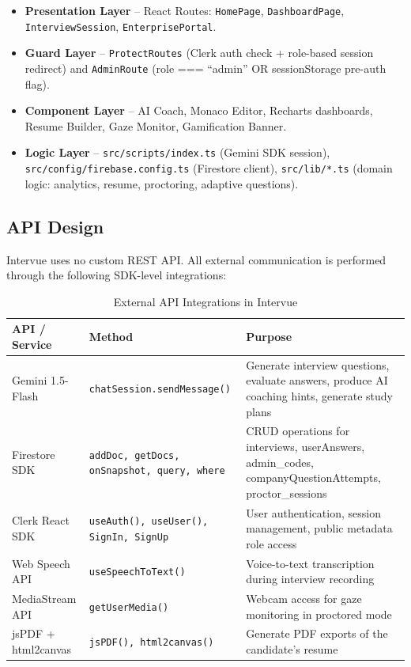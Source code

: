 \begin{itemize}
	\item \textbf{Presentation Layer} -- React Routes: \texttt{HomePage}, \texttt{DashboardPage}, \texttt{InterviewSession}, \texttt{EnterprisePortal}.
	\item \textbf{Guard Layer} -- \texttt{ProtectRoutes} (Clerk auth check + role-based session redirect) and \texttt{AdminRoute} (role === ``admin'' OR sessionStorage pre-auth flag).
	\item \textbf{Component Layer} -- AI Coach, Monaco Editor, Recharts dashboards, Resume Builder, Gaze Monitor, Gamification Banner.
	\item \textbf{Logic Layer} -- \texttt{src/scripts/index.ts} (Gemini SDK session), \texttt{src/config/firebase.config.ts} (Firestore client), \texttt{src/lib/*.ts} (domain logic: analytics, resume, proctoring, adaptive questions).
\end{itemize}

\subsection{API Design}
Intervue uses no custom REST API. All external communication is performed through the following SDK-level integrations:

\begin{table}[h!]
\centering
\caption{External API Integrations in Intervue}
\begin{tabular}{|p{3.5cm}|p{3cm}|p{6cm}|}
\hline
\textbf{API / Service} & \textbf{Method} & \textbf{Purpose} \\
\hline
Gemini 1.5-Flash & \texttt{chatSession.sendMessage()} & Generate interview questions, evaluate answers, produce AI coaching hints, generate study plans \\
\hline
Firestore SDK & \texttt{addDoc, getDocs, onSnapshot, query, where} & CRUD operations for interviews, userAnswers, admin\_codes, companyQuestionAttempts, proctor\_sessions \\
\hline
Clerk React SDK & \texttt{useAuth(), useUser(), SignIn, SignUp} & User authentication, session management, public metadata role access \\
\hline
Web Speech API & \texttt{useSpeechToText()} & Voice-to-text transcription during interview recording \\
\hline
MediaStream API & \texttt{getUserMedia()} & Webcam access for gaze monitoring in proctored mode \\
\hline
jsPDF + html2canvas & \texttt{jsPDF(), html2canvas()} & Generate PDF exports of the candidate's resume \\
\hline
\end{tabular}
\end{table}

